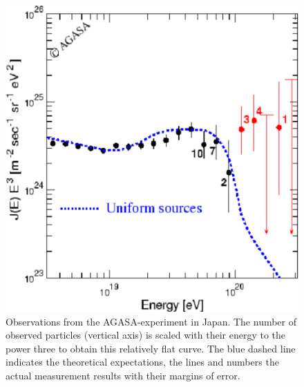 \documentclass[12pt,a4paper]{article}
\numberwithin{equation}{section}
\numberwithin{figure}{section}
\numberwithin{table}{section}
\begin{document}
\begin{figure}\begin{center}
\includegraphics[scale=0.4]{spectrum_zoom.pdf}
\caption{Observations from the AGASA-experiment in Japan. The number of observed particles (vertical axis) is scaled with their energy to the power three to obtain this relatively flat curve. The blue dashed line indicates the theoretical expectations, the lines and numbers the actual measurement results with their margins of error.}\label{fig:spectrum_zoom}
\end{center}\end{figure}
\end{document}
